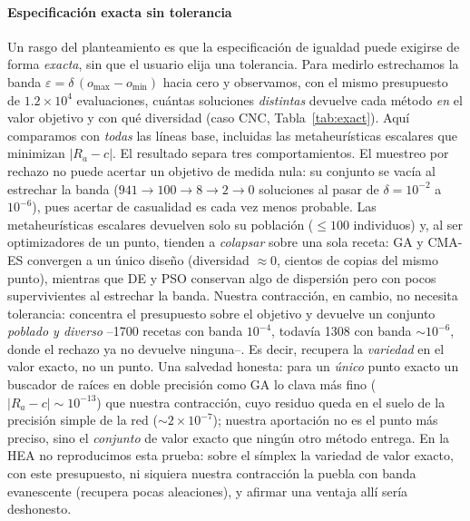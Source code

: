 \documentclass[5p,times,authoryear]{elsarticle}
\begin{document}
\paragraph{Especificación exacta sin tolerancia} Un rasgo del planteamiento es que
la especificación de igualdad puede exigirse de forma \emph{exacta}, sin que el
usuario elija una tolerancia. Para medirlo estrechamos la banda
$\varepsilon=\delta\,(o_{\max}-o_{\min})$ hacia cero y observamos, con el mismo
presupuesto de $1.2\times10^4$ evaluaciones, cuántas soluciones \emph{distintas}
devuelve cada método \emph{en} el valor objetivo y con qué diversidad (caso CNC,
Tabla~\ref{tab:exact}). Aquí comparamos con \emph{todas} las líneas base, incluidas las
metaheurísticas escalares que minimizan $|R_a-c|$. El resultado separa tres
comportamientos. El muestreo por rechazo no puede acertar un objetivo de medida nula: su
conjunto se vacía al estrechar la banda ($941\to100\to8\to2\to0$ soluciones al pasar de
$\delta=10^{-2}$ a $10^{-6}$), pues acertar de casualidad es cada vez menos probable. Las
metaheurísticas escalares devuelven solo su población ($\le100$ individuos) y, al ser
optimizadores de un punto, tienden a \emph{colapsar} sobre una sola receta: GA y CMA-ES
convergen a un único diseño (diversidad $\approx0$, cientos de copias del mismo punto),
mientras que DE y PSO conservan algo de dispersión pero con pocos supervivientes al
estrechar la banda. Nuestra contracción, en cambio, no necesita tolerancia: concentra el
presupuesto sobre el objetivo y devuelve un conjunto \emph{poblado y diverso} --1700
recetas con banda $10^{-4}$, todavía 1308 con banda $\sim10^{-6}$, donde el rechazo ya no
devuelve ninguna--. Es decir, recupera la \emph{variedad} en el valor exacto, no un punto.
Una salvedad honesta: para un \emph{único} punto exacto un buscador de raíces en doble
precisión como GA lo clava más fino ($|R_a-c|\sim10^{-13}$) que nuestra contracción, cuyo
residuo queda en el suelo de la precisión simple de la red ($\sim2\times10^{-7}$); nuestra
aportación no es el punto más preciso, sino el \emph{conjunto} de valor exacto que ningún
otro método entrega. En la HEA no reproducimos esta prueba: sobre el símplex la variedad de
valor exacto, con este presupuesto, ni siquiera nuestra contracción la puebla con banda
evanescente (recupera pocas aleaciones), y afirmar una ventaja allí sería deshonesto.
\end{document}
